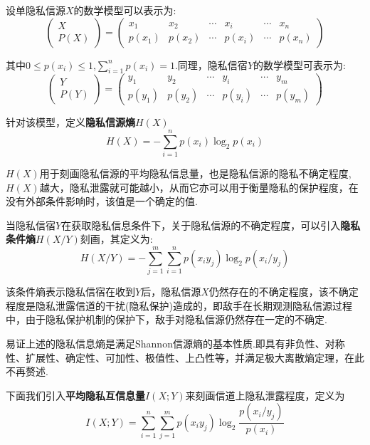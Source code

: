 设单隐私信源$X$的数学模型可以表示为:
\begin{equation}
\begin{pmatrix}
X\\ 
P(X)
\end{pmatrix}=\begin{pmatrix}
x_{1} & x_{2} & \cdots  & x_{i} & \cdots  & x_{n}\\ 
p(x_{1})& p(x_{2}) & \cdots & p(x_{i}) & \cdots & p(x_{n})
\end{pmatrix}
\end{equation}

其中$0\leqslant p(x_{i})\leqslant1$,$\sum_{i=1}^{n}p(x_{i})=1$.同理，隐私信宿$Y$的数学模型可表示为:
\begin{equation}
\begin{pmatrix}
Y\\ 
P(Y)
\end{pmatrix}=\begin{pmatrix}
y_{1} & y_{2} & \cdots  & y_{i} & \cdots  & y_{m}\\ 
p(y_{1})& p(y_{2}) & \cdots & p(y_{i}) & \cdots & p(y_{m})
\end{pmatrix}
\end{equation}

针对该模型，定义\textbf{隐私信源熵}$H(X)$
\begin{equation}
H(X)=-\sum_{i=1}^{n}p(x_{i})\log_{2}p(x_{i})
\end{equation}

$H(X)$用于刻画隐私信源的平均隐私信息量，也是隐私信源的隐私不确定程度,$H(X)$越大，隐私泄露就可能越小，从而它亦可以用于衡量隐私的保护程度，在没有外部条件影响时，该值是一个确定的值.

当隐私信宿$Y$在获取隐私信息条件下，关于隐私信源的不确定程度，可以引入\textbf{隐私条件熵}$H(X/Y)$刻画，其定义为:
\begin{equation}
H(X/Y)=-\sum_{j=1}^{m}\sum_{i=1}^{n}p(x_{i}y_{j})\log_{2}p(x_{i}/y_{j})
\end{equation}

该条件熵表示隐私信宿在收到$Y$后，隐私信源$X$仍然存在的不确定程度，该不确定程度是隐私泄露信道的干扰(隐私保护)造成的，即敌手在长期观测隐私信源过程中，由于隐私保护机制的保护下，敌手对隐私信源仍然存在一定的不确定.

易证上述的隐私信息熵是满足Shannon信源熵的基本性质.即具有非负性、对称性、扩展性、确定性、可加性、极值性、上凸性等，并满足极大离散熵定理，在此不再赘述.

下面我们引入\textbf{平均隐私互信息量}$I(X;Y)$来刻画信道上隐私泄露程度，定义为
\begin{equation}
I(X;Y)=\sum_{i=1}^{n}\sum_{j=1}^{m}p(x_{i}y_{j})\log_{2}\frac{p(x_{i}/y_{j})}{p(x_{i})}
\end{equation}

